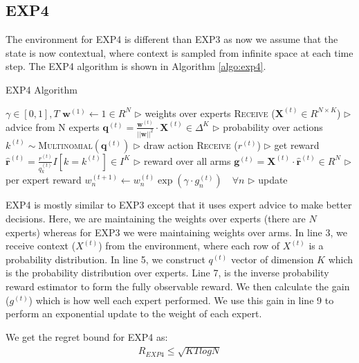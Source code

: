 \documentclass[11pt]{article}
\begin{document}
\subsection{EXP4}
\label{sec:exp4}
The environment for EXP4 is different than EXP3 as now we assume that the state is now contextual, where context is sampled from infinite space at each time step. The EXP4 algorithm is shown in Algorithm \ref{algo:exp4}.

\begin{algorithm}[H]
\caption{EXP4 Algorithm\cite{exp3}}
\label{algo:exp4}
\begin{algorithmic}[1]
\REQUIRE $\gamma \in [0, 1], T$
\STATE $\pmb{w}^{(1)} \leftarrow 1 \in R^N$ \hfill $\triangleright$ weights over experts
\STATE \textsc{Receive} ($\pmb{X}^{(t)}\in R^{N \times K}$) \hfill $\triangleright$ advice from N experts
\STATE $\pmb{q}^{(t)} = \frac{\pmb{w}^{(t)}}{||\pmb{w}||^2} \cdot \pmb{X}^{(t)} \in \Delta^K$ \hfill $\triangleright$ probability over actions
\STATE $k^{(t)} \sim $\textsc{Multinomial}$(\pmb{q}^{(t)})$ \hfill $\triangleright$ draw action
\STATE \textsc{Receive} ($r^{(t)}$) \hfill $\triangleright$ get reward
\STATE $\pmb{\hat{r}}^{(t)} = \frac{r^{(t)}}{q^{(t)}_k} I [k = k^{(t)}] \in I^K$ \hfill $\triangleright$ reward over all arms
\STATE $\pmb{g}^{(t)} = \pmb{X}^{(t)} \cdot \pmb{\hat{r}}^{(t)} \in R^N $ \hfill $\triangleright$ per expert reward
\STATE $w_{n}^{(t+1)}\leftarrow w_{n}^{(t)} \exp{(\gamma \cdot g_n^{(t)})} \quad \forall n$ \hfill $\triangleright$ update
\ENDFOR
\end{algorithmic}
\end{algorithm}

EXP4 is mostly similar to EXP3 except that it uses expert advice to make better decisions. Here, we are maintaining the weights over experts (there are $N$ experts) whereas for EXP3 we were maintaining weights over arms. In line 3, we receive context ($X^{(t)}$) from the environment, where each row of $X^{(t)}$ is a probability distribution. In line 5, we construct $q^{(t)}$ vector of dimension $K$ which is the probability distribution over experts. Line 7, is the inverse probability reward estimator to form the fully observable reward. We then calculate the gain ($g^{(t)}$) which is how well each expert performed. We use this gain in line 9 to perform an exponential update to the weight of each expert.

We get the regret bound for EXP4 as:
\begin{align}
    R_{EXP4} \leq \sqrt{KTlogN}
\end{align}
\end{document}
